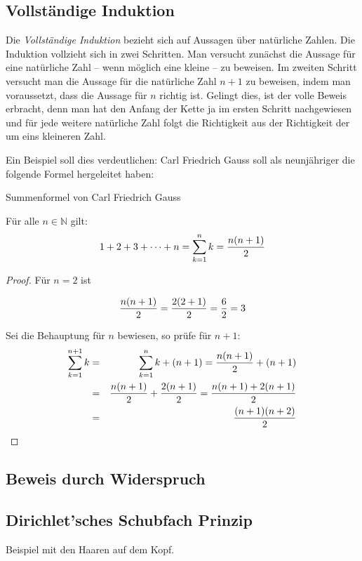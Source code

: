 \subsection{Vollständige Induktion}

Die \emph{Vollständige Induktion} bezieht sich auf Aussagen über natürliche Zahlen. Die Induktion vollzieht sich in zwei Schritten. Man versucht zunächst die Aussage für eine natürliche Zahl -- wenn möglich eine kleine -- zu beweisen. Im zweiten Schritt versucht man die Aussage für die natürliche Zahl $n+1$ zu beweisen, indem man voraussetzt, dass die Aussage für $n$ richtig ist. Gelingt dies, ist der volle Beweis erbracht, denn man hat den Anfang der Kette ja im ersten Schritt nachgewiesen und für jede weitere natürliche Zahl folgt die Richtigkeit aus der Richtigkeit der um eins kleineren Zahl.

Ein Beispiel soll dies verdeutlichen: Carl Friedrich Gauss soll als neunjähriger die folgende Formel hergeleitet haben:

\begin{theorem}
Summenformel von Carl Friedrich Gauss
\begin{claim}
Für alle $n\in \mathbb{N}$ gilt:
\[ 1+2+3+ \dots +n = \sum_{k=1}^{n}k = {n(n+1)\over 2} \]
\end{claim}
\begin{proof}
Für $n=2$ ist

\[ {n(n+1)\over 2} = {2(2+1)\over 2} = {6\over 2} = 3 \]

Sei die Behauptung für $n$ bewiesen, so prüfe für $n+1$:
\begin{eqnarray*}
\sum_{k=1}^{n+1} k &=& \sum_{k=1}^{n} k  + (n+1) = {n(n+1)\over 2} +(n+1) \\
 &=& {n(n+1)\over 2} +{2(n+1)\over 2} = {n(n+1)+2(n+1) \over 2} \\
 &=& {(n+1)(n+2) \over 2}
\end{eqnarray*}
\end{proof}

\end{theorem}


\subsection{Beweis durch Widerspruch}
\begin{TODO}

\end{TODO}


\subsection{Dirichlet'sches Schubfach Prinzip}
\begin{TODO}
Beispiel mit den Haaren auf dem Kopf. 
\end{TODO}

